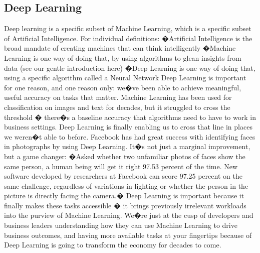 \subsection{Deep Learning}
Deep learning is a specific subset of Machine Learning, which is a specific subset of Artificial Intelligence. For individual definitions:
�Artificial Intelligence is the broad mandate of creating machines that can think intelligently
�Machine Learning is one way of doing that, by using algorithms to glean insights from data (see our gentle introduction here)
�Deep Learning is one way of doing that, using a specific algorithm called a Neural Network
Deep Learning is important for one reason, and one reason only: we�ve been able to achieve meaningful, useful accuracy on tasks that matter. Machine Learning has been used for classification on images and text for decades, but it struggled to cross the threshold � there�s a baseline accuracy that algorithms need to have to work in business settings. Deep Learning is finally enabling us to cross that line in places we weren�t able to before.
Facebook has had great success with identifying faces in photographs by using Deep Learning. It�s not just a marginal improvement, but a game changer: �Asked whether two unfamiliar photos of faces show the same person, a human being will get it right 97.53 percent of the time. New software developed by researchers at Facebook can score 97.25 percent on the same challenge, regardless of variations in lighting or whether the person in the picture is directly facing the camera.�
Deep Learning is important because it finally makes these tasks accessible � it brings previously irrelevant workloads into the purview of Machine Learning. We�re just at the cusp of developers and business leaders understanding how they can use Machine Learning to drive business outcomes, and having more available tasks at your fingertips because of Deep Learning is going to transform the economy for decades to come.

